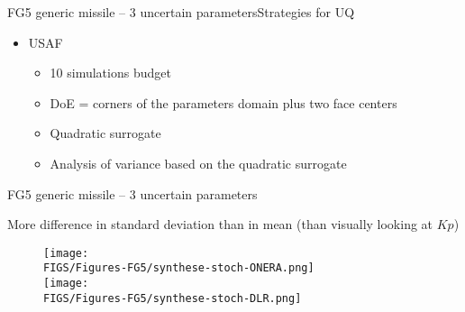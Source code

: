 \documentclass[10pt]{beamer}
\def\vr{\vspace{3mm}}
\def\begit{\begin{itemize}}
\def\endit{\end{itemize}}
\begin{document}
\begin{frame}{FG5 generic missile -- 3 uncertain parameters}{Strategies for UQ}  

\begit
%
\item USAF
  \begit
  \item 10 simulations budget 
  \item DoE = corners of the parameters domain plus two  face centers
  \item Quadratic surrogate
  \item Analysis of variance based on the quadratic surrogate
  \endit
%
\endit
%
\end{frame} 
%

\begin{frame}{FG5 generic missile -- 3 uncertain parameters}{}  

More difference in standard deviation than in mean (than visually looking at $Kp$)   
%
\begin{figure}[!h]
\begin{center}
\texttt{[image: \\FIGS/Figures-FG5/synthese-stoch-ONERA.png]}
\vr\\
\texttt{[image: \\FIGS/Figures-FG5/synthese-stoch-DLR.png]}
\end{center}
\end{figure}
%
\end{frame} 
%
%
\end{document}
